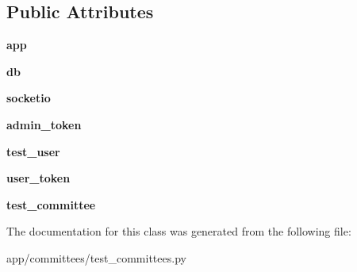\subsection*{Public Attributes}
\begin{DoxyCompactItemize}
\item 
\mbox{\label{classapp_1_1committees_1_1test__committees_1_1_test_committees_ae2bf96611bc28ffbf4142330741bca44}} 
{\bfseries app}
\item 
\mbox{\label{classapp_1_1committees_1_1test__committees_1_1_test_committees_aaf5039e314df2fed17967373a83a5acf}} 
{\bfseries db}
\item 
\mbox{\label{classapp_1_1committees_1_1test__committees_1_1_test_committees_adb3e1a2e813d9e66d4d2d3ba291b6132}} 
{\bfseries socketio}
\item 
\mbox{\label{classapp_1_1committees_1_1test__committees_1_1_test_committees_a2cced98c280ea4303b8a80f5fe75d8e5}} 
{\bfseries admin\+\_\+token}
\item 
\mbox{\label{classapp_1_1committees_1_1test__committees_1_1_test_committees_a4e738d69f0ee217dedf4c366aaa844e5}} 
{\bfseries test\+\_\+user}
\item 
\mbox{\label{classapp_1_1committees_1_1test__committees_1_1_test_committees_a03702ef7b06ea492dff5683e82e8c27f}} 
{\bfseries user\+\_\+token}
\item 
\mbox{\label{classapp_1_1committees_1_1test__committees_1_1_test_committees_a3bee2c449c441c727e7a1629f83f15f8}} 
{\bfseries test\+\_\+committee}
\end{DoxyCompactItemize}


The documentation for this class was generated from the following file\+:\begin{DoxyCompactItemize}
\item 
app/committees/test\+\_\+committees.\+py\end{DoxyCompactItemize}
